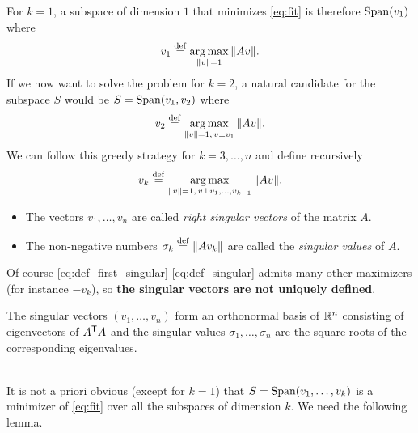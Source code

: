 \documentclass[11pt,nocut]{article}
\begin{document}
For $k=1$, a subspace of dimension $1$ that minimizes \eqref{eq:fit} is therefore ${{\rm Span}}(v_1)$ where
\begin{equation}\label{eq:def_first_singular}
v_1 \overset{\rm def}{=} \operatorname*{arg\,max}_{\|v\| = 1} \|A v\|.
\end{equation}
If we now want to solve the problem for $k=2$, a natural candidate for the subspace $S$ would be $S = {{\rm Span}}(v_1, v_2)$ where
\begin{equation}\label{eq:def_second_singular}
v_2 \overset{\rm def}{=} \operatorname*{arg\,max}_{\|v\| = 1, \, v \perp v_1} \| A v \|.
\end{equation}
We can follow this greedy strategy for $k = 3, \dots, n$ and define recursively
\begin{equation}\label{eq:def_singular}
v_{k} \overset{\rm def}{=} \operatorname*{arg\,max}_{\|v\| = 1, \, v \perp v_1, \dots, v_{k-1}} \| A v \|.
\end{equation}
\begin{definition}
	\begin{itemize}
		\item The vectors $v_1, \dots, v_n$ are called \emph{right singular vectors} of the matrix $A$.
		\item The non-negative numbers $\sigma_k \overset{\rm def}{=} \|A v_k\|$ are called the \emph{singular values} of $A$.
	\end{itemize}
\end{definition}
Of course \eqref{eq:def_first_singular}-\eqref{eq:def_singular} admits many other maximizers (for instance $-v_k$), so \textbf{the singular vectors are not uniquely defined}.

\begin{proposition}\label{prop:right_eigen}
	The singular vectors $(v_1, \dots, v_n)$ form an orthonormal basis of $\mathbb{R}^n$ consisting of eigenvectors of $A^{{\sf T}} A$ and the singular values $\sigma_1, \dots, \sigma_n$ are the square roots of the corresponding eigenvalues.
\end{proposition}
\\

It is not a priori obvious (except for $k=1$) that $S = {{\rm Span}}(v_1, \dots, v_k)$ is a minimizer of \eqref{eq:fit} over all the subspaces of dimension $k$.
We need the following lemma.
\end{document}
